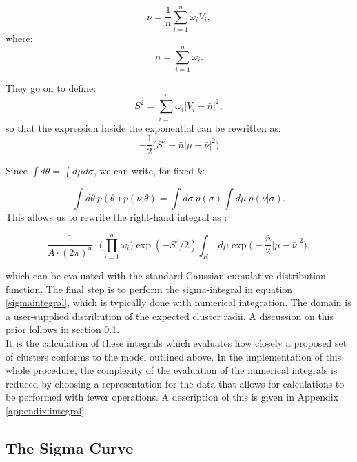 \documentclass[11pt]{article}
\begin{document}
\begin{equation*}
	\bar{\nu} = \frac{1}{\bar{n}} \sum_{i=1}^{n} \omega_i V_i,
\end{equation*} 
where:
\begin{equation}\label{nbar}
	\bar{n} = \sum_{i=1}^{n} \omega_i.
\end{equation}

They go on to define:
\begin{equation}\label{s2}
		S^2 = \sum_{i=1}^{n} \omega_i
	|V_i - \bar{n}|^2,
\end{equation}
so that the expression inside the exponential can be rewritten as:
\begin{equation}
	-\frac{1}{2} \Big( S^2 - \bar{n} |\mu - \bar{\nu}|^2
	\Big)
\end{equation}

Since $\int d\theta = \int d\mu d\sigma$, we can write, for fixed $k$:

\begin{equation}
	\label{sigmaintegral}
	\int d\theta \ p(\theta) p(\nu | \theta) = \int d\sigma \ p(\sigma) \int d\mu \ p(\nu | \sigma).
\end{equation}
This allows us to rewrite the right-hand integral as \cite{Rubin-Delanchy2015}:

\begin{equation}
	\frac{1}{A \cdot (2\pi)^n} \cdot 	\Bigg(\underset{i = 1}{\overset{n}{\prod}} \omega_i \Bigg)
	\exp(-S^2/2) \int_R \ d\mu \exp \Bigg( -\frac{\bar{n}}{2}
	|\mu - \bar{\nu}|^2
	\Bigg),
\end{equation}

which can be evaluated with the standard Gaussian cumulative distribution function.
The final step is to perform the sigma-integral in equation \ref{sigmaintegral}, which is typically done with numerical integration. The domain is a user-supplied distribution of the expected cluster radii. A discussion on this prior follows in section \ref{sigmacurvediscussion}. \\

It is the calculation of these integrals which evaluates how closely a proposed set of clusters conforms to the model outlined above. In the implementation of this whole procedure, the complexity of the evaluation of the numerical integrals is reduced by choosing a representation for the data that allows for calculations to be performed with fewer operations. A description of this is given in Appendix \ref{appendix:integral}.

\subsection{The Sigma Curve}
\label{sigmacurvediscussion}
\end{document}
